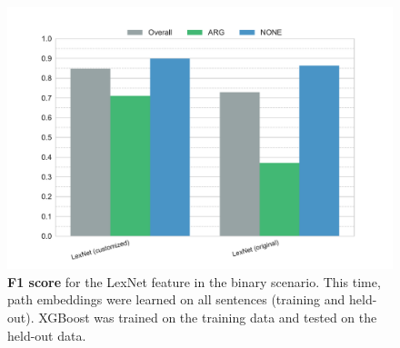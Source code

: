     
\begin{figure}[htbp]
         \caption{\textbf{F1 score} for the LexNet feature in the binary scenario. This time, path embeddings were learned on all sentences (training and held-out). XGBoost was trained on the training data and tested on the held-out data.} 
    \label{fig:jl_2_f1}
    \centering
	\includegraphics[width=1\linewidth]{images/extra/jl-f1-True}
    \end{figure}
